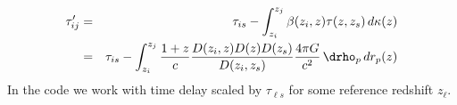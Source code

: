 \begin{eqnarray}
  \tau'_{i j} &=& \tau_{i s} - \int_{z_i}^{z_j} \beta(z_i, z) \tau(z, z_s)\,d\kappa(z) \\
  &=& \tau_{i s} - \int_{z_i}^{z_j} \frac{1+z}{c} \frac{D(z_i,z) D(z) D(z_s)}{D(z_i,z_s)} \frac{4\pi G}{c^2}\,\drho_p\,dr_p(z) \nonumber
\end{eqnarray}
In the code we work with time delay scaled by $\tau_{\ell s}$ for some reference redshift $z_\ell$.